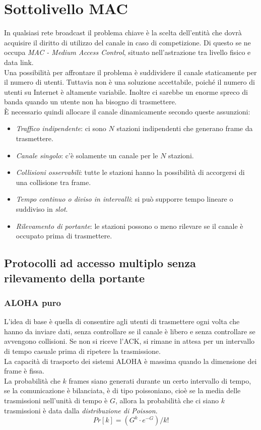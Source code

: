 \documentclass[10pt,a4paper,twoside]{article}
\begin{document}
\section{Sottolivello MAC}
In qualsiasi rete broadcast il problema chiave è la scelta dell'entità che dovrà acquisire il diritto di utilizzo del canale in caso di competizione. Di questo se ne occupa \textit{MAC - Medium Access Control}, situato nell'astrazione tra livello fisico e data link.\\
Una possibilità per affrontare il problema è suddividere il canale staticamente per il numero di utenti. Tuttavia non è una soluzione accettabile, poiché il numero di utenti su Internet è altamente variabile. Inoltre ci sarebbe un enorme spreco di banda quando un utente non ha bisogno di trasmettere.\\
È necessario quindi allocare il canale dinamicamente secondo queste assunzioni:
\begin{itemize}
\item \textit{Traffico indipendente}: ci sono $N$ stazioni indipendenti che generano frame da trasmettere.
\item \textit{Canale singolo}: c'è solamente un canale per le $N$ stazioni.
\item \textit{Collisioni osservabili}: tutte le stazioni hanno la possibilità di accorgersi di una collisione tra frame.
\item \textit{Tempo continuo o diviso in intervalli}: si può supporre tempo lineare o suddiviso in \textit{slot}.
\item \textit{Rilevamento di portante}: le stazioni possono o meno rilevare se il canale è occupato prima di trasmettere.
\end{itemize}

\subsection{Protocolli ad accesso multiplo senza rilevamento della portante}
\subsubsection{ALOHA puro}
L'idea di base è quella di consentire agli utenti di trasmettere ogni volta che hanno da inviare dati, senza controllare se il canale è libero e senza controllare se avvengono collisioni. Se non si riceve l'ACK, si rimane in attesa per un intervallo di tempo casuale prima di ripetere la trasmissione.\\
La capacità di trasporto dei sistemi ALOHA è massima quando la dimensione dei frame è fissa.\\
La probabilità che $k$ frames siano generati durante un certo intervallo di tempo, se la comunicazione è bilanciata, è di tipo poissoniano, cioè se la media delle trasmissioni nell'unità di tempo è $G$, allora la probabilità che ci siano $k$ trasmissioni è data dalla \textit{distribuzione di Poisson}.\\
\begin{equation}
Pr[k]=(G^k\cdot e^{-G})/k!
\end{equation}
\end{document}
